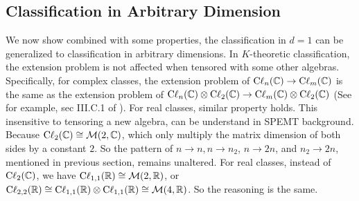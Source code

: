 \documentclass{article}
\begin{document}
\subsection{Classification in Arbitrary Dimension}
\label{sec:Classification in Arbitrary Dimension}
We now show combined with some properties, the classification in $d=1$ can be
generalized to classification in arbitrary dimensions. In $K$-theoretic
classification, the extension problem is not affected when tensored with some
other algebras. Specifically, for complex classes, the extension problem of
$\mathrm{C\ell}_{n}(\mathbb{C})\to\mathrm{C\ell}_{m}(\mathbb{C})$ is the same as the extension
problem of $\mathrm{C\ell}_{n}(\mathbb{C})\otimes\mathrm{C\ell}_{2}(\mathbb{C})\to
\mathrm{C\ell}_{m}(\mathbb{C})\otimes\mathrm{C\ell}_{2}(\mathbb{C})$ (See for example, sec
III.C.1 of \cite{Chiu2016}). For real classes, similar property holds.
This insensitive to tensoring a new algebra, can be understand in SPEMT
background. Because $\mathrm{C\ell}_{2}(\mathbb{C})\cong\mathcal{M}(2,\mathbb{C})$, which only
multiply the matrix dimension of both sides by a constant $2$. So the pattern of
$n\to n, n\to n_2$, $n\to 2n$, and $n_2\to 2n$, mentioned in previous section,
remains unaltered. For real classes, instead of $\mathrm{C\ell}_{2}(\mathbb{C})$, we
have $\mathrm{C\ell}_{1,1}(\mathbb{R})\cong\mathcal{M}(2,\mathbb{R})$, or
$\mathrm{C\ell}_{2,2}(\mathbb{R})\cong\mathrm{C\ell}_{1,1}(\mathbb{R})\otimes\mathrm{C\ell}_{1,1}(\mathbb{R})\cong\mathcal{M}(4,\mathbb{R})$.
So the reasoning is the same.
\end{document}
